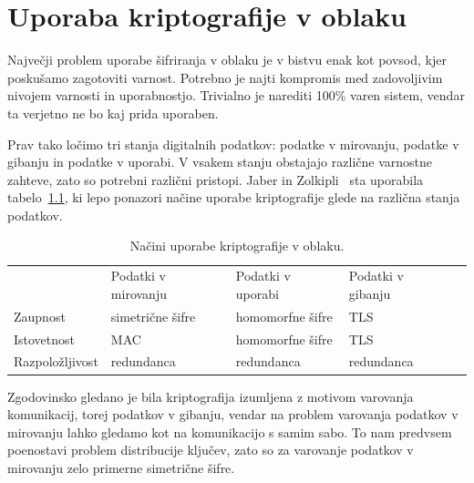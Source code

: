 \documentclass[12pt,a4paper,openany,tikz]{book}
\theoremstyle{plain}
\theoremstyle{definition}
\begin{document}
\cleardoublepage
\chapter{Uporaba kriptografije v oblaku}
\label{chap:Uporaba kriptografije v oblaku}

Največji problem uporabe šifriranja v oblaku je v bistvu enak kot povsod, kjer poskušamo zagotoviti varnost. Potrebno je najti kompromis med zadovoljivim nivojem varnosti in uporabnostjo. Trivialno je narediti 100\% varen sistem, vendar ta verjetno ne bo kaj prida uporaben.

Prav tako ločimo tri stanja digitalnih podatkov: podatke v mirovanju, podatke v gibanju in podatke v uporabi. V vsakem stanju obstajajo različne varnostne zahteve, zato so potrebni različni pristopi. Jaber in Zolkipli~\cite{jaber2013use} sta uporabila tabelo~\ref{tbl:cloudtriad}, ki lepo ponazori načine uporabe kriptografije glede na različna stanja podatkov.

\begin{table}[ht!]
  \centering
  \begin{tabular}{lllll}
                                        & Podatki v mirovanju                   & Podatki v uporabi                    & Podatki v gibanju              &  \\ \cline{2-4}
    \multicolumn{1}{l|}{Zaupnost}       & \multicolumn{1}{l|}{simetrične šifre} & \multicolumn{1}{l|}{homomorfne šifre} & \multicolumn{1}{l|}{TLS}        &  \\ \cline{2-4}
    \multicolumn{1}{l|}{Istovetnost}    & \multicolumn{1}{l|}{MAC}              & \multicolumn{1}{l|}{homomorfne šifre} & \multicolumn{1}{l|}{TLS}        &  \\ \cline{2-4}
    \multicolumn{1}{l|}{Razpoložljivost} & \multicolumn{1}{l|}{redundanca}       & \multicolumn{1}{l|}{redundanca}       & \multicolumn{1}{l|}{redundanca} &  \\ \cline{2-4}
  \end{tabular}
  \caption{Načini uporabe kriptografije v oblaku.}
\label{tbl:cloudtriad}
\end{table}

Zgodovinsko gledano je bila kriptografija izumljena z motivom varovanja komunikacij, torej podatkov v gibanju, vendar na problem varovanja podatkov v mirovanju lahko gledamo kot na komunikacijo s samim sabo. To nam predvsem poenostavi problem distribucije ključev, zato so za varovanje podatkov v mirovanju zelo primerne simetrične šifre.
\end{document}
